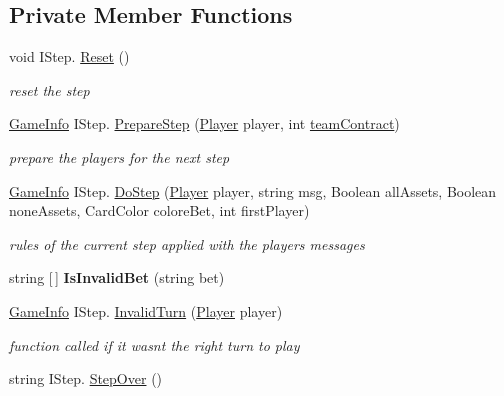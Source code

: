 \subsection*{Private Member Functions}
\begin{DoxyCompactItemize}
\item 
void I\+Step. \hyperlink{class_coinche_1_1_auction_ae6b090721adfc333705f5f79ca9b462a}{Reset} ()
\begin{DoxyCompactList}\small\item\em reset the step \end{DoxyCompactList}\item 
\hyperlink{class_coinche_1_1_tools_1_1_game_info}{Game\+Info} I\+Step. \hyperlink{class_coinche_1_1_auction_a9596ae8ce46f848244854d59c9bedadb}{Prepare\+Step} (\hyperlink{class_coinche_1_1_player}{Player} player, int \hyperlink{class_coinche_1_1_auction_af83095f623b0dd43fa3b3008a1743926}{team\+Contract})
\begin{DoxyCompactList}\small\item\em prepare the players for the next step \end{DoxyCompactList}\item 
\hyperlink{class_coinche_1_1_tools_1_1_game_info}{Game\+Info} I\+Step. \hyperlink{class_coinche_1_1_auction_ac43279f6867bd7896aee8e6ae504c472}{Do\+Step} (\hyperlink{class_coinche_1_1_player}{Player} player, string msg, Boolean all\+Assets, Boolean none\+Assets, Card\+Color colore\+Bet, int first\+Player)
\begin{DoxyCompactList}\small\item\em rules of the current step applied with the players messages \end{DoxyCompactList}\item 
\mbox{\label{class_coinche_1_1_auction_a4d26a9a7fbe7ef886c75d8393750ab9b}} 
string \mbox{[}$\,$\mbox{]} {\bfseries Is\+Invalid\+Bet} (string bet)
\item 
\hyperlink{class_coinche_1_1_tools_1_1_game_info}{Game\+Info} I\+Step. \hyperlink{class_coinche_1_1_auction_a00eba97a2289eb3bf7b2f4f7c84c8349}{Invalid\+Turn} (\hyperlink{class_coinche_1_1_player}{Player} player)
\begin{DoxyCompactList}\small\item\em function called if it wasn\textquotesingle{}t the right turn to play \end{DoxyCompactList}\item 
string I\+Step. \hyperlink{class_coinche_1_1_auction_ab1621fd742e17a9814671116d4d0682c}{Step\+Over} ()

\end{DoxyCompactItemize}
